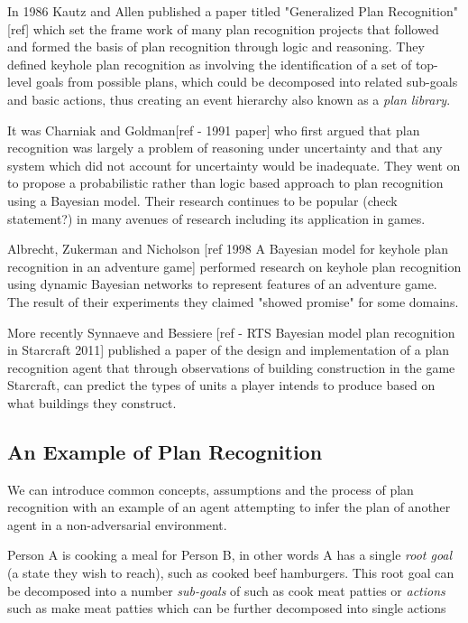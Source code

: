 \documentclass[parskip]{cs4rep}
\begin{document}
In 1986 Kautz and Allen published a paper titled "Generalized Plan Recognition"[ref] which set the frame work of many plan recognition projects that followed and formed the basis of plan recognition through logic and reasoning. They defined keyhole plan recognition as involving the identification of a set of top-level goals from possible plans, which could be decomposed into related sub-goals and basic actions, thus creating an event hierarchy also known as a \textit{plan library}. 

It was Charniak and Goldman[ref - 1991 paper] who first argued that plan recognition was largely a problem of reasoning under uncertainty and that any system which did not account for uncertainty would be inadequate. They went on to propose a probabilistic rather than logic based approach to  plan recognition using a Bayesian model. Their research continues to be popular (check statement?) in many avenues of research including its application in games.

Albrecht, Zukerman and Nicholson [ref 1998 A Bayesian model for keyhole plan recognition in an adventure game] performed research on keyhole plan recognition using dynamic Bayesian networks to represent features of an adventure game. The result of their experiments they claimed "showed promise" for some domains. 

More recently Synnaeve and Bessiere [ref - RTS Bayesian model plan recognition in Starcraft 2011] published a paper of the design and implementation of a plan recognition agent that through observations of building construction in the game Starcraft, can predict the types of units a player intends to produce based on what buildings they construct.

\subsection{An Example of Plan Recognition}

We can introduce common concepts, assumptions and the process of plan recognition with an example of an agent attempting to infer the plan of another agent in a non-adversarial environment. 

Person A is cooking a meal for Person B, in other words A has a single \textit{root goal} (a state they wish to reach), such as cooked beef hamburgers. This root goal can be decomposed into a number \textit{sub-goals} of such as cook meat patties or \textit{actions} such as make meat patties  which can be further decomposed into single actions
\end{document}
